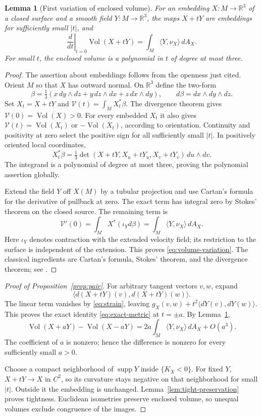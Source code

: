 \documentclass[11pt]{amsart}
\newtheorem{lemma}[theorem]{Lemma}
\theoremstyle{definition}
\newcommand{\R}{\mathbb R}
\DeclareMathOperator{\supp}{supp}
\DeclareMathOperator{\Vol}{Vol}
\begin{document}
\begin{lemma}[First variation of enclosed volume]\label{lem:volume}
For an embedding $X:M\to\R^3$ of a closed surface and a smooth field
$Y:M\to\R^3$, the maps $X+tY$ are embeddings for sufficiently small
$|t|$, and
\begin{equation}\label{eq:volume-variation}
 \left.\frac{d}{dt}\right|_{t=0}\Vol(X+tY)
 =\int_M\langle Y,\nu_X\rangle\,dA_X.
\end{equation}
For small $t$, the enclosed volume is a polynomial in $t$ of degree
at most three.
\end{lemma}
\begin{proof}
The assertion about embeddings follows from the openness just cited.
Orient $M$ so that $X$ has outward normal. On $\R^3$ define the
two-form
\[
 \beta=\tfrac13(x\,dy\wedge dz+y\,dz\wedge dx+z\,dx\wedge dy),
 \qquad d\beta=dx\wedge dy\wedge dz.
\]
Set $X_t=X+tY$ and $\mathcal V(t)=\int_M X_t^*\beta$.
The divergence theorem gives $\mathcal V(0)=\Vol(X)>0$.
For every embedded $X_t$ it also gives
$\mathcal V(t)=\Vol(X_t)$ or $-\Vol(X_t)$, according to orientation.
Continuity and positivity at zero select the positive sign for
all sufficiently small $|t|$.
In positively oriented local coordinates,
\[
 X_t^*\beta=\tfrac13
       \det(X+tY,X_u+tY_u,X_v+tY_v)\,du\wedge dv.
\]
The integrand is a polynomial of degree at most three, proving
the polynomial assertion globally.

Extend the field $Y$ off $X(M)$ by a tubular projection and use
Cartan's formula for the derivative of pullback at zero.
The exact term has integral zero by Stokes' theorem on the
closed source. The remaining term is
\[
 \mathcal V'(0)=\int_M X^*(\iota_Y d\beta)
       =\int_M\langle Y,\nu_X\rangle\,dA_X.
\]
Here $\iota_Y$ denotes contraction with the extended velocity field;
its restriction to the surface is independent of the extension.
This proves \eqref{eq:volume-variation}. The classical ingredients
are Cartan's formula, Stokes' theorem, and the divergence theorem;
see \cite[Theorem~14.35 and Chapter~16, including Theorem~16.32]{Lee}.
\end{proof}

\begin{proof}[Proof of Proposition~\ref{prop:pair}]
For arbitrary tangent vectors $v,w$, expand
\[
 \langle d(X+tY)(v),d(X+tY)(w)\rangle.
\]
The linear term vanishes by \eqref{eq:strain}, leaving
$g_X(v,w)+t^2\langle dY(v),dY(w)\rangle$. This proves the exact
identity \eqref{eq:exact-metric} at $t=\pm a$.
By Lemma~\ref{lem:volume},
\begin{equation}\label{eq:odd-volume}
 \Vol(X+aY)-\Vol(X-aY)
 =2a\int_M\langle Y,\nu_X\rangle\,dA_X+O(a^3).
\end{equation}
The coefficient of $a$ is nonzero; hence the difference is nonzero
for every sufficiently small $a>0$.

Choose a compact neighborhood of $\supp Y$ inside $\{K_X<0\}$.
For fixed $Y$, $X+tY\to X$ in $C^2$, so its curvature stays negative
on that neighborhood for small $|t|$. Outside it the embedding is
unchanged. Lemma~\ref{lem:tight-preservation} proves tightness.
Euclidean isometries preserve enclosed volume, so unequal volumes
exclude congruence of the images.
\end{proof}
\end{document}
